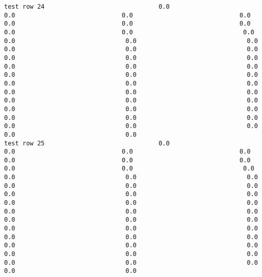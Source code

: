 \documentclass[11pt]{article}
\begin{document}
\begin{verbatim}
test row 24                               0.0                             0.0                             0.0                             0.0                             0.0                             0.0                             0.0                             0.0                             0.0                              0.0                              0.0                              0.0                              0.0                              0.0                              0.0                              0.0                              0.0                              0.0                              0.0                              0.0                              0.0                              0.0                              0.0                              0.0                              0.0                              0.0                              0.0                              0.0                              0.0                              0.0                              0.0                              0.0                              0.0                              0.0                              0.0                              0.0                              0.0                              0.0                              0.0                              0.0                              0.0                              0.0                              0.0                              0.0                              0.0
test row 25                               0.0                             0.0                             0.0                             0.0                             0.0                             0.0                             0.0                             0.0                             0.0                              0.0                              0.0                              0.0                              0.0                              0.0                              0.0                              0.0                              0.0                              0.0                              0.0                              0.0                              0.0                              0.0                              0.0                              0.0                              0.0                              0.0                              0.0                              0.0                              0.0                              0.0                              0.0                              0.0                              0.0                              0.0                              0.0                              0.0                              0.0                              0.0                              0.0                              0.0                              0.0                              0.0                              0.0                              0.0                              0.0

\end{verbatim}
\end{document}
